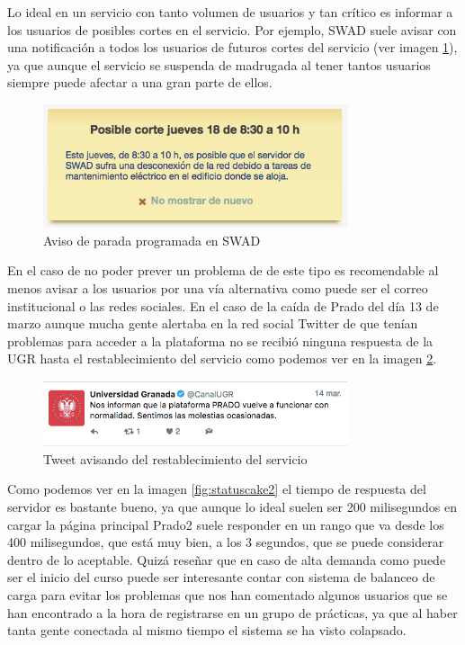 \bigskip
Lo ideal en un servicio con tanto volumen de usuarios y tan crítico es informar a los usuarios de posibles cortes en el servicio. Por ejemplo, SWAD suele avisar con una notificación a todos los usuarios de futuros cortes del servicio (ver imagen \ref{fig:paroprogramadoswad}), ya que aunque el servicio se suspenda de madrugada al tener tantos usuarios siempre puede afectar a una gran parte de ellos.

\begin{figure}[H]
\centering
\includegraphics[width=0.8\textwidth]{../images/paroprogramadoswad}
\caption{Aviso de parada programada en SWAD}
\label{fig:paroprogramadoswad}
\end{figure}

\bigskip
En el caso de no poder prever un problema de de este tipo es recomendable al menos avisar a los usuarios por una vía alternativa como puede ser el correo institucional o las redes sociales. En el caso de la caída de Prado del día 13  de marzo aunque mucha gente alertaba en la red social Twitter de que tenían problemas para acceder a la plataforma no se recibió ninguna respuesta de la UGR hasta el restablecimiento del servicio como podemos ver en la imagen \ref{fig:tweet}.



\begin{figure}[H]
\centering
\includegraphics[width=0.8\textwidth]{../images/tweet}
\caption{Tweet avisando del restablecimiento del servicio}
\label{fig:tweet}
\end{figure}

\bigskip
Como podemos ver en la imagen \ref{fig:statuscake2} el tiempo de respuesta del servidor es bastante bueno, ya que aunque lo ideal suelen ser 200 milisegundos en cargar la página principal Prado2 suele responder en un rango que va desde los 400 milisegundos, que está muy bien, a los 3 segundos, que se puede considerar dentro de lo aceptable. Quizá reseñar que en caso de alta demanda como puede ser el inicio del curso puede ser interesante contar con sistema de balanceo de carga para evitar los problemas que nos han comentado algunos usuarios que se han encontrado a la hora de registrarse en un grupo de prácticas, ya que al haber tanta gente conectada al mismo tiempo el sistema se ha visto colapsado.



